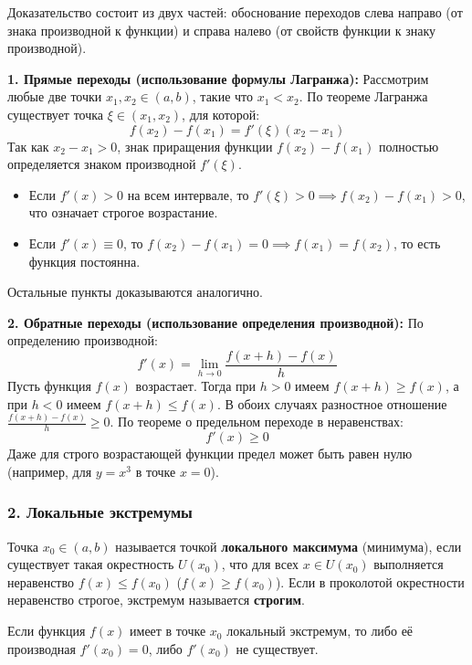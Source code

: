 \begin{tcolorbox}[title=Доказательство, breakable]
Доказательство состоит из двух частей: обоснование переходов слева направо (от знака производной к функции) и справа налево (от свойств функции к знаку производной).

\textbf{1. Прямые переходы (использование формулы Лагранжа):}
Рассмотрим любые две точки $x_1, x_2 \in (a, b)$, такие что $x_1 < x_2$. По теореме Лагранжа существует точка $\xi \in (x_1, x_2)$, для которой:
\[ f(x_2) - f(x_1) = f'(\xi)(x_2 - x_1) \]
Так как $x_2 - x_1 > 0$, знак приращения функции $f(x_2) - f(x_1)$ полностью определяется знаком производной $f'(\xi)$.
\begin{itemize}
    \item Если $f'(x) > 0$ на всем интервале, то $f'(\xi) > 0 \implies f(x_2) - f(x_1) > 0$, что означает строгое возрастание.
    \item Если $f'(x) \equiv 0$, то $f(x_2) - f(x_1) = 0 \implies f(x_1) = f(x_2)$, то есть функция постоянна.
\end{itemize}
Остальные пункты доказываются аналогично.

\textbf{2. Обратные переходы (использование определения производной):}
По определению производной:
\[ f'(x) = \lim_{h \to 0} \frac{f(x + h) - f(x)}{h} \]
Пусть функция $f(x)$ возрастает. Тогда при $h > 0$ имеем $f(x + h) \ge f(x)$, а при $h < 0$ имеем $f(x + h) \le f(x)$. В обоих случаях разностное отношение $\frac{f(x + h) - f(x)}{h} \ge 0$. По теореме о предельном переходе в неравенствах:
\[ f'(x) \ge 0 \]
Даже для строго возрастающей функции предел может быть равен нулю (например, для $y = x^3$ в точке $x = 0$).
\end{tcolorbox}

\subsubsection*{2. Локальные экстремумы}

\begin{definition}
Точка $x_0 \in (a, b)$ называется точкой \textbf{локального максимума} (минимума), если существует такая окрестность $U(x_0)$, что для всех $x \in U(x_0)$ выполняется неравенство $f(x) \le f(x_0)$ ($f(x) \ge f(x_0)$). Если в проколотой окрестности неравенство строгое, экстремум называется \textbf{строгим}.
\end{definition}

\begin{theorem}
Если функция $f(x)$ имеет в точке $x_0$ локальный экстремум, то либо её производная $f'(x_0) = 0$, либо $f'(x_0)$ не существует.
\end{theorem}

